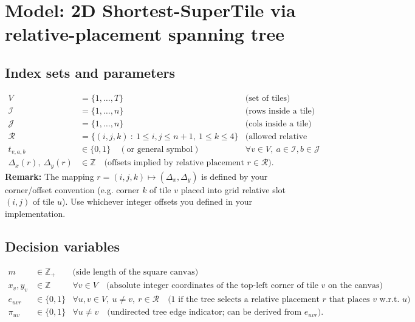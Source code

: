 \documentclass{article}
\begin{document}
\section*{Model: 2D Shortest-SuperTile via relative-placement spanning tree}

\subsection*{Index sets and parameters}
\begin{align*}
V &= \{1,\dots,T\}  &\text{(set of tiles)}\\
\mathcal{I} &= \{1,\dots,n\} &\text{(rows inside a tile)}\\
\mathcal{J} &= \{1,\dots,n\} &\text{(cols inside a tile)}\\
\mathcal{R} &= \{(i,j,k)\ :\ 1\le i,j\le n+1,\ 1\le k\le 4\} &\text{(allowed relative placements)}\\
t_{v,a,b} &\in \{0,1\}\quad (\text{or general symbol}) &\forall v\in V,\ a\in\mathcal{I}, b\in\mathcal{J}\\
\Delta_x(r),\ \Delta_y(r) &\in \mathbb{Z}\quad \text{(offsets implied by relative placement }r\in\mathcal{R}\text{)}.
\end{align*}
\noindent\textbf{Remark:} The mapping $r=(i,j,k)\mapsto (\Delta_x,\Delta_y)$ is defined by your corner/offset convention (e.g. corner \(k\) of tile \(v\) placed into grid relative slot \((i,j)\) of tile \(u\)). Use whichever integer offsets you defined in your implementation.

\subsection*{Decision variables}
\begin{align*}
m &\in \mathbb{Z}_{+} &\text{(side length of the square canvas)}\\
x_v,y_v &\in \mathbb{Z} &\forall v\in V \quad\text{(absolute integer coordinates of the top-left corner of tile $v$ on the canvas)}\\
e_{uvr} &\in\{0,1\} &\forall u,v\in V,\ u\ne v,\ r\in\mathcal{R}
\quad\text{(1 if the tree selects a relative placement $r$ that places $v$ w.r.t.\ $u$)}\\
\pi_{uv} &\in\{0,1\} &\forall u\ne v \quad\text{(undirected tree edge indicator; can be derived from $e_{uvr}$)}.
\end{align*}
\end{document}
